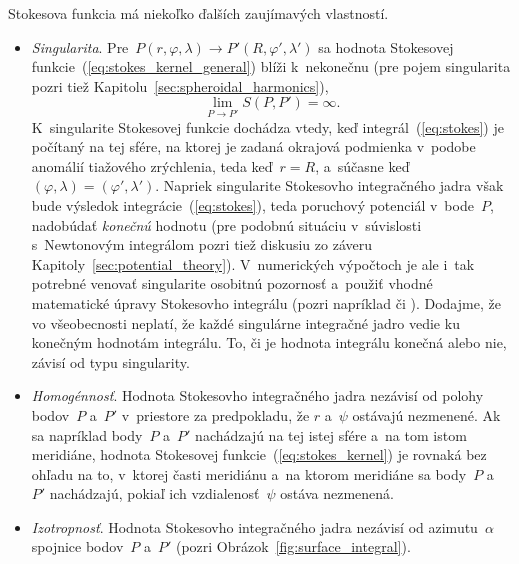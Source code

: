 \documentclass[a4paper, 12pt]{book}
\begin{document}
Stokesova funkcia má niekoľko ďalších zaujímavých vlastností.
%
\begin{itemize}
\item \emph{Singularita}.  Pre~$P(r, \varphi, \lambda) \rightarrow P'(R, 
\varphi', \lambda')$ sa hodnota Stokesovej 
funkcie~(\ref{eq:stokes_kernel_general}) blíži k~nekonečnu (pre pojem 
singularita pozri tiež Kapitolu~\ref{sec:spheroidal_harmonics}),
%
\begin{equation}
\label{eq:stokes_singularity}
\lim\limits_{P \rightarrow P'} S(P, P') = \infty{.}
\end{equation}
%
K~singularite Stokesovej funkcie dochádza vtedy, keď integrál~(\ref{eq:stokes}) 
je počítaný na tej sfére, na ktorej je zadaná okrajová podmienka v~podobe 
anomálií tiažového zrýchlenia, teda keď~$r = R$, a~súčasne keď~$(\varphi, 
\lambda) = (\varphi', \lambda')$.  Napriek singularite Stokesovho integračného 
jadra však bude výsledok integrácie~(\ref{eq:stokes}), teda poruchový potenciál 
v~bode~$P$, nadobúdať \emph{konečnú} hodnotu (pre podobnú situáciu v~súvislosti 
s~Newtonovým integrálom pozri tiež diskusiu zo záveru 
Kapitoly~\ref{sec:potential_theory}).  V~numerických výpočtoch je ale i~tak 
potrebné venovať singularite osobitnú pozornosť a~použiť vhodné matematické 
úpravy Stokesovho integrálu (pozri napríklad \cite{MoritzPhysicalGeodesy} či 
\cite{Hees1991}).  Dodajme, že vo všeobecnosti neplatí, že každé singulárne 
integračné jadro vedie ku konečným hodnotám integrálu.  To, či je hodnota 
integrálu konečná alebo nie, závisí od typu singularity.
%
\item \emph{Homogénnosť}.  Hodnota Stokesovho integračného jadra nezávisí od 
polohy bodov~$P$ a~$P'$ v~priestore za predpokladu, že $r$ a~$\psi$ ostávajú 
nezmenené.  Ak sa napríklad body~$P$ a~$P'$ nachádzajú na tej istej sfére a~na 
tom istom meridiáne, hodnota Stokesovej funkcie~(\ref{eq:stokes_kernel}) je 
rovnaká bez ohľadu na to, v~ktorej časti meridiánu a~na ktorom meridiáne sa 
body~$P$ a~$P'$ nachádzajú, pokiaľ ich vzdialenosť~$\psi$ ostáva nezmenená.
%
\item \emph{Izotropnosť}.  Hodnota Stokesovho integračného jadra nezávisí od 
azimutu~$\alpha$ spojnice bodov~$P$ a~$P'$ (pozri 
Obrázok~\ref{fig:surface_integral}).
\end{itemize}
\end{document}
